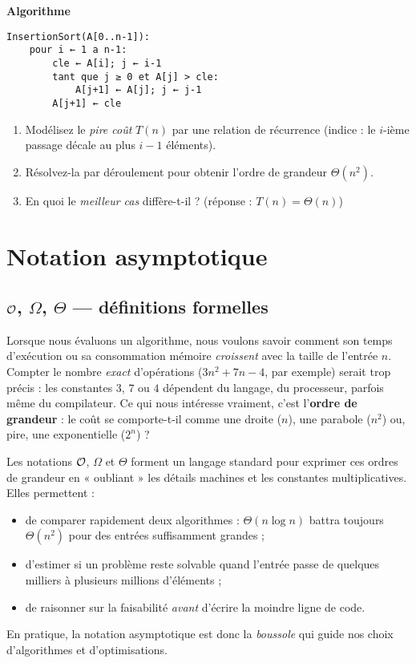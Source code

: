 \begin{exercice}
\textbf{Algorithme}
\begin{lstlisting}
InsertionSort(A[0..n-1]):
    pour i ← 1 a n-1:
        cle ← A[i]; j ← i-1
        tant que j ≥ 0 et A[j] > cle:
            A[j+1] ← A[j]; j ← j-1
        A[j+1] ← cle
\end{lstlisting}

\begin{enumerate}[label=\alph*)]
  \item Modélisez le \emph{pire coût} $T(n)$ par une relation de récurrence
        (indice : le $i$-ième passage décale au plus $i-1$ éléments).
  \item Résolvez-la par déroulement pour obtenir l’ordre de grandeur
        \(\Theta(n^{2})\).
  \item En quoi le \emph{meilleur cas} diffère-t-il ? (réponse : $T(n)=\Theta(n)$)
\end{enumerate}
\end{exercice}


\section{Notation asymptotique}

\subsection{$\mathcal{O}$, $\Omega$, $\Theta$ — définitions formelles}

Lorsque nous évaluons un algorithme, nous voulons savoir comment son
temps d’exécution ou sa consommation mémoire \emph{croissent} avec la taille
de l’entrée $n$.  Compter le nombre \emph{exact} d’opérations
($3n^{2}+7n-4$, par exemple) serait trop précis : les constantes $3$, $7$ ou
$4$ dépendent du langage, du processeur, parfois même du compilateur.
Ce qui nous intéresse vraiment, c’est l’\textbf{ordre de grandeur} :
le coût se comporte-t-il comme une droite ($n$), une parabole ($n^{2}$) ou,
pire, une exponentielle ($2^{n}$) ?

Les notations $\mathcal{O}$, $\Omega$ et $\Theta$ forment un langage standard pour
exprimer ces ordres de grandeur en « oubliant » les détails machines et les
constantes multiplicatives.  Elles permettent :
\begin{itemize}
  \item de comparer rapidement deux algorithmes : $\Theta(n\log n)$ battra
        toujours $\Theta(n^{2})$ pour des entrées suffisamment grandes ;
  \item d’estimer si un problème reste solvable quand l’entrée passe
        de quelques milliers à plusieurs millions d’éléments ;
  \item de raisonner sur la faisabilité \emph{avant} d’écrire la moindre
        ligne de code.
\end{itemize}
En pratique, la notation asymptotique est donc la \emph{boussole} qui guide
nos choix d’algorithmes et d’optimisations.


